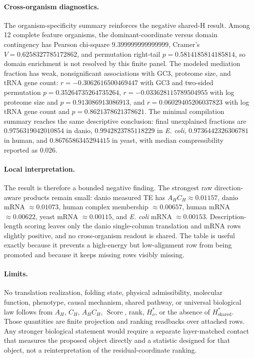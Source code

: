 \paragraph{Cross-organism diagnostics.}
The organism-specificity summary reinforces the negative shared-H result.  Among 12 complete feature organisms, the dominant-coordinate versus domain contingency has Pearson chi-square $9.399999999999999$, Cramer's $V=0.6258327785172862$, and permutation right-tail $p=0.5814185814185814$, so domain enrichment is not resolved by this finite panel.  The modeled mediation fraction has weak, nonsignificant associations with GC3, proteome size, and tRNA gene count: $r=-0.3062616500469447$ with GC3 and two-sided permutation $p=0.35264735264735264$, $r=-0.033628115789504955$ with log proteome size and $p=0.913086913086913$, and $r=0.06029405206037823$ with log tRNA gene count and $p=0.8621378621378621$.  The minimal compilation summary reaches the same descriptive conclusion: final unexplained fractions are $0.9756319042010854$ in danio, $0.9942823785118229$ in \emph{E. coli}, $0.9736442326306781$ in human, and $0.8676586345294415$ in yeast, with median compressibility reported as $0.026$.

\paragraph{Local interpretation.}
The result is therefore a bounded negative finding.  The strongest raw direction-aware products remain small: danio measured TE has $A_HC_H\approx0.01157$, danio mRNA $\approx0.01073$, human complex membership $\approx0.00657$, human mRNA $\approx0.00622$, yeast mRNA $\approx0.00115$, and \emph{E. coli} mRNA $\approx0.00153$.  Description-length scoring leaves only the danio single-column translation and mRNA rows slightly positive, and no cross-organism readout is shared.  The table is useful exactly because it prevents a high-energy but low-alignment row from being promoted and because it keeps missing rows visibly missing.

\paragraph{Limits.}
No translation realization, folding state, physical admissibility, molecular function, phenotype, causal mechanism, shared pathway, or universal biological law follows from $A_H$, $C_H$, $A_HC_H$, $\operatorname{Score}$, rank, $H_o^*$, or the absence of $H_{\mathrm{shared}}^*$.  Those quantities are finite projection and ranking readbacks over attached rows.  Any stronger biological statement would require a separate layer-matched contact that measures the proposed object directly and a statistic designed for that object, not a reinterpretation of the residual-coordinate ranking.

